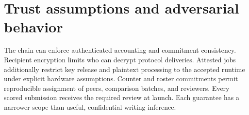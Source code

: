 \section{Trust assumptions and adversarial
behavior}\label{trust-assumptions-and-adversarial-behavior}

The chain can enforce authenticated accounting and commitment
consistency. Recipient encryption limits who can decrypt protocol
deliveries. Attested jobs additionally restrict key release and plaintext
processing to the accepted runtime under explicit hardware assumptions. Counter and roster commitments permit reproducible assignment
of peers, comparison batches, and reviewers. Every scored submission
receives the required review at launch. Each guarantee has a narrower scope than useful,
confidential writing inference.

